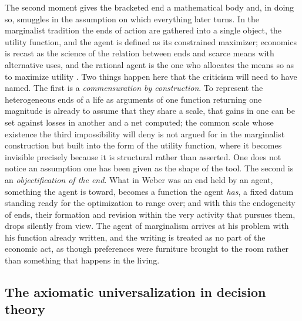 The second moment gives the bracketed end a mathematical body and, in doing so, smuggles in the assumption on which everything later turns. In the marginalist tradition the ends of action are gathered into a single object, the utility function, and the agent is defined as its constrained maximizer; economics is recast as the science of the relation between ends and scarce means with alternative uses, and the rational agent is the one who allocates the means so as to maximize utility \parencite{robbins1932nature}. Two things happen here that the criticism will need to have named. The first is a \emph{commensuration by construction}. To represent the heterogeneous ends of a life as arguments of one function returning one magnitude is already to assume that they share a scale, that gains in one can be set against losses in another and a net computed; the common scale whose existence the third impossibility will deny is not argued for in the marginalist construction but built into the form of the utility function, where it becomes invisible precisely because it is structural rather than asserted. One does not notice an assumption one has been given as the shape of the tool. The second is an \emph{objectification of the end}. What in Weber was an end held by an agent, something the agent is toward, becomes a function the agent \emph{has}, a fixed datum standing ready for the optimization to range over; and with this the endogeneity of ends, their formation and revision within the very activity that pursues them, drops silently from view. The agent of marginalism arrives at his problem with his function already written, and the writing is treated as no part of the economic act, as though preferences were furniture brought to the room rather than something that happens in the living.

\subsection*{The axiomatic universalization in decision theory}

